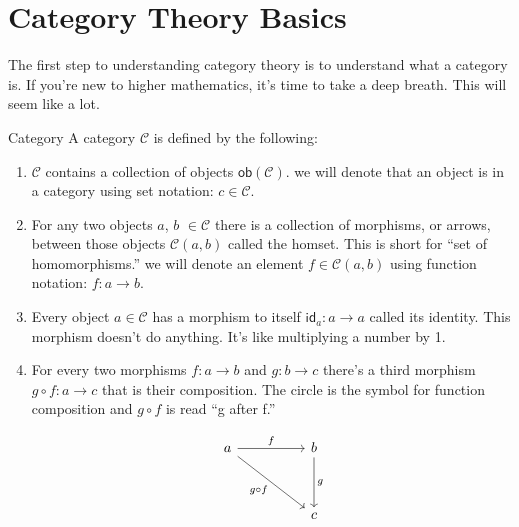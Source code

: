 \documentclass[12pt]{article}
\begin{document}
\section*{Category Theory Basics}
The first step to understanding category theory is to understand what a category is.
If you're new to higher mathematics, it's time to take a deep breath.
This will seem like a lot.

\begin{definition}{Category}{}
  A category $\mathcal{C}$ is defined by the following:
  \begin{enumerate}
    \item $\mathcal{C}$ contains a collection of objects $\mathsf{ob}(\mathcal{C})$. we will denote that an object is in a category using set notation: $c\in\mathcal{C}$.
    \item For any two objects $a$, $b$ $\in \mathcal{C}$ there is a collection of morphisms, or arrows, between those objects $\mathcal{C}(a,b)$ called the homset. This is short for ``set of homomorphisms.'' we will denote an element $f\in\mathcal{C}(a,b)$ using function notation: $f:a\rightarrow b$.
    \item Every object $a\in \mathcal{C}$ has a morphism to itself $\mathsf{id}_a:a\rightarrow a$ called its identity. This morphism doesn't do anything. It's like multiplying a number by 1.
    \item For every two morphisms $f:a\rightarrow b$ and $g: b\rightarrow c$ there's a third morphism $g\circ f:a\rightarrow c$ that is their composition. The circle is the symbol for function composition and $g \circ f$ is read ``g after f.''

          \[\begin{tikzcd}
              a && b \\
              \\
              && c
              \arrow["f", from=1-1, to=1-3]
              \arrow["g", from=1-3, to=3-3]
              \arrow["{g\circ f}"', from=1-1, to=3-3]
            \end{tikzcd}\]

  \end{enumerate}
\end{definition}
\end{document}
